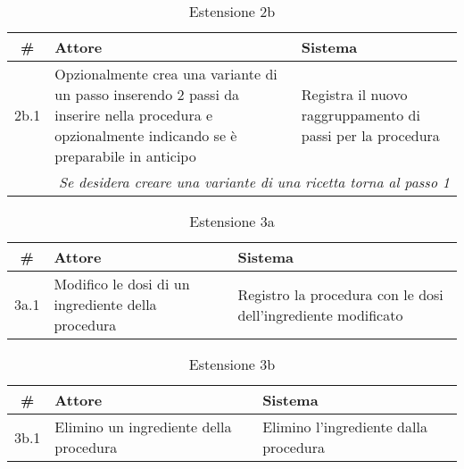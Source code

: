 \begin{table}[H]\centering\caption*{Estensione 2b}
      \small
      \begin{tabular}{|c|p{7cm}|p{6.24cm}|}
            \hline\bfseries \# & \bfseries Attore                                                                                                                                 & \bfseries Sistema                                          \\\hline
            2b.1               & Opzionalmente crea una variante di un passo inserendo 2 passi da inserire nella procedura e opzionalmente indicando se è preparabile in anticipo & Registra il nuovo raggruppamento di passi per la procedura \\\hline
            \multicolumn{3}{|r|}{\textit{Se desidera creare una variante di una ricetta torna al passo 1}}                                                                                                                                     \\\hline
      \end{tabular}
\end{table}

\begin{table}[H]\centering\caption*{Estensione 3a}
      \small
      \begin{tabular}{|c|p{7cm}|p{6.24cm}|}
            \hline\bfseries \# & \bfseries Attore                                   & \bfseries Sistema                                             \\\hline
            3a.1               & Modifico le dosi di un ingrediente della procedura & Registro la procedura con le dosi dell’ingrediente modificato \\\hline
      \end{tabular}
\end{table}

\begin{table}[H]\centering\caption*{Estensione 3b}
      \small
      \begin{tabular}{|c|p{7cm}|p{6.24cm}|}
            \hline\bfseries \# & \bfseries Attore                       & \bfseries Sistema                     \\\hline
            3b.1               & Elimino un ingrediente della procedura & Elimino l’ingrediente dalla procedura \\\hline
      \end{tabular}
\end{table}

